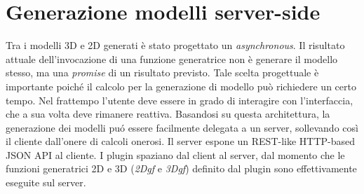 \section{Generazione modelli server-side}
\label{sec:chapter_3_section_5}

\noindent
Tra i modelli 3D e 2D generati è stato progettato un \emph{asynchronous}.
Il risultato attuale dell'invocazione di una funzione generatrice non \`e generare il modello stesso,
ma una \emph{promise} di un risultato previsto. Tale scelta progettuale \`e importante poich\'e il calcolo per la
generazione di modello pu\`o richiedere un certo tempo.
Nel frattempo l'utente deve essere in grado di interagire con l'interfaccia, che a sua volta deve rimanere reattiva.
Basandosi su questa architettura, la generazione dei modelli pu\'o essere facilmente delegata a un server,
sollevando così il cliente dall'onere di calcoli onerosi. Il server espone un REST-like HTTP-based JSON API al cliente.
I plugin spaziano dal client al server, dal momento che le funzioni generatrici 2D e 3D (\emph{2Dgf} e \emph{3Dgf})
 definito dal plugin sono effettivamente eseguite sul server.


